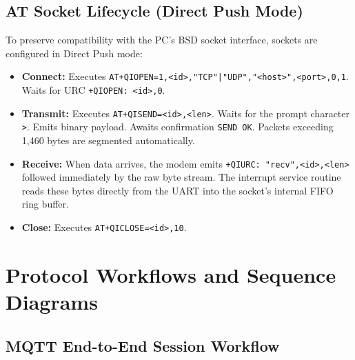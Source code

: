 \documentclass[11pt,a4paper]{article}
\newcommand{\code}[1]{\texttt{#1}}
\begin{document}
\subsection{AT Socket Lifecycle (Direct Push Mode)}
To preserve compatibility with the PC's BSD socket interface, sockets are configured in Direct Push mode:
\begin{itemize}
  \item \textbf{Connect:} Executes \code{AT+QIOPEN=1,<id>,"TCP"|"UDP","<host>",<port>,0,1}. Waits for URC \code{+QIOPEN: <id>,0}.
  \item \textbf{Transmit:} Executes \code{AT+QISEND=<id>,<len>}. Waits for the prompt character \code{>}. Emits binary payload. Awaits confirmation \code{SEND OK}. Packets exceeding 1,460 bytes are segmented automatically.
  \item \textbf{Receive:} When data arrives, the modem emits \code{+QIURC: "recv",<id>,<len>} followed immediately by the raw byte stream. The interrupt service routine reads these bytes directly from the UART into the socket's internal FIFO ring buffer.
  \item \textbf{Close:} Executes \code{AT+QICLOSE=<id>,10}.
\end{itemize}

\section{Protocol Workflows and Sequence Diagrams}

\subsection{MQTT End-to-End Session Workflow}
\end{document}
